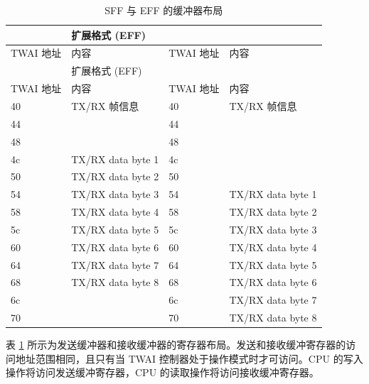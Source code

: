 \documentclass[main\_\_CN.tex]{subfiles}
\begin{document}
\begin{longtable}[c]{|p{2.5cm}|p{4cm}|p{2.5cm}|p{4cm}|}
\caption{SFF 与 EFF 的缓冲器布局}\label{Figure:TWAI_memory_box}
\\\hline
\rowcolor{lightgray}
\multicolumn{2}{|l|}{标准格式 (SFF)}&\multicolumn{2}{|l|}{扩展格式 (EFF)}\\\hline
\rowcolor{gray!25}
TWAI 地址 & 内容 & TWAI 地址 & 内容\\\hline
\endfirsthead
\hline
\rowcolor{lightgray}
\multicolumn{2}{|l|}{标准格式 (SFF)}&\multicolumn{2}{|l|}{扩展格式 (EFF)}\\\hline
\rowcolor{gray!25}
TWAI 地址 & 内容 & TWAI 地址 & 内容\\\hline
\endhead
\endfoot
\hexprefix{}40&TX/RX 帧信息 &\hexprefix{}40&TX/RX 帧信息\\\hline
\hexprefix{}44&\cellcolor{mycyan}{TX/RX identifier 1}&\hexprefix{}44&\cellcolor{mycyan}{TX/RX identifier 1}\\\hline
\hexprefix{}48&\cellcolor{mycyan}{TX/RX identifier 2}&\hexprefix{}48&\cellcolor{mycyan}{TX/RX identifier 2}\\\hline
\hexprefix{}4c&TX/RX data byte 1&\hexprefix{}4c&\cellcolor{mycyan}{TX/RX identifier 3}\\\hline
\hexprefix{}50&TX/RX data byte 2&\hexprefix{}50&\cellcolor{mycyan}{TX/RX identifier 4}\\\hline
\hexprefix{}54&TX/RX data byte 3&\hexprefix{}54&TX/RX data byte 1\\\hline
\hexprefix{}58&TX/RX data byte 4&\hexprefix{}58&TX/RX data byte 2\\\hline
\hexprefix{}5c&TX/RX data byte 5&\hexprefix{}5c&TX/RX data byte 3\\\hline
\hexprefix{}60&TX/RX data byte 6&\hexprefix{}60&TX/RX data byte 4\\\hline
\hexprefix{}64&TX/RX data byte 7&\hexprefix{}64&TX/RX data byte 5\\\hline
\hexprefix{}68&TX/RX data byte 8&\hexprefix{}68&TX/RX data byte 6\\\hline
\hexprefix{}6c&\cellcolor{yellow}{保留}&\hexprefix{}6c&TX/RX data byte 7\\\hline
\hexprefix{}70&\cellcolor{yellow}{保留}&\hexprefix{}70&TX/RX data byte 8\\\hline
\end{longtable}

表 \ref{Figure:TWAI_memory_box} 所示为发送缓冲器和接收缓冲器的寄存器布局。发送和接收缓冲寄存器的访问地址范围相同，且只有当 TWAI 控制器处于操作模式时才可访问。CPU 的写入操作将访问发送缓冲寄存器，CPU 的读取操作将访问接收缓冲寄存器。
\end{document}
